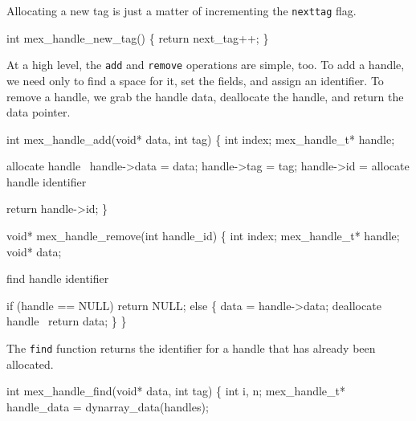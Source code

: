 Allocating a new tag is just a matter of incrementing the {\tt{}next{}tag} flag.

\nwenddocs{}\plusendmoddef
int mex_handle_new_tag()
\{
    return next_tag++;
\}

\nwendcode{}\nwdocspar

At a high level, the {\tt{}add} and {\tt{}remove} operations are simple, too.
To add a handle, we need only to find a space for it, set the fields,
and assign an identifier.  To remove a handle, we grab the handle data,
deallocate the handle, and return the data pointer.

\nwenddocs{}\plusendmoddef
int mex_handle_add(void* data, int tag)
\{
    int index;
    mex_handle_t* handle;

    \LA{}allocate handle~{\nwtagstyle{}}\RA{}
    handle->data = data;
    handle->tag  = tag;
    handle->id   = \LA{}allocate handle identifier~{\nwtagstyle{}}\RA{}

    return handle->id;
\}

\nwendcode{}\nwdocspar

\nwenddocs{}\plusendmoddef
void* mex_handle_remove(int handle_id)
\{
    int index;
    mex_handle_t* handle;
    void*         data;

    \LA{}find handle identifier~{\nwtagstyle{}}\RA{}

    if (handle == NULL)
        return NULL;
    else \{
        data = handle->data;
        \LA{}deallocate handle~{\nwtagstyle{}}\RA{}
        return data;
    \}
\}

\nwendcode{}\nwdocspar

The {\tt{}find} function returns the identifier for a handle that has
already been allocated.

\nwenddocs{}\plusendmoddef
int mex_handle_find(void* data, int tag)
\{
    int i, n;
    mex_handle_t* handle_data = dynarray_data(handles);


